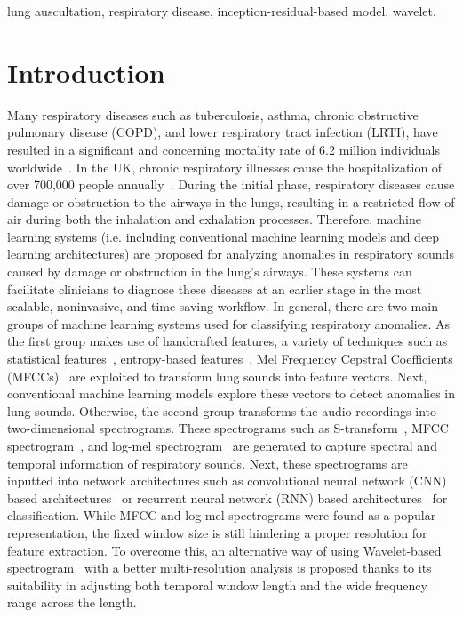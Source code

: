 \documentclass[conference]{IEEEtran}
\begin{document}
\begin{IEEEkeywords}
lung auscultation, respiratory disease, inception-residual-based model, wavelet.
\end{IEEEkeywords}

\section{Introduction}
\label{intro}

Many respiratory diseases such as tuberculosis, asthma, chronic obstructive pulmonary disease (COPD), and lower respiratory tract infection (LRTI), have resulted in a significant and concerning mortality rate of 6.2 million individuals worldwide~\cite{who_1}. In the UK, chronic respiratory illnesses cause the hospitalization of over 700,000 people annually~\cite{lunguk}. During the initial phase, respiratory diseases cause damage or obstruction to the airways in the lungs, resulting in a restricted flow of air during both the inhalation and exhalation processes. Therefore, machine learning systems (i.e. including conventional machine learning models and deep learning architectures) are proposed for analyzing anomalies in respiratory sounds caused by damage or obstruction in the lung's airways. These systems can facilitate clinicians to diagnose these diseases at an earlier stage in the most scalable, noninvasive, and time-saving workflow.
In general, there are two main groups of machine learning systems used for classifying respiratory anomalies. As the first group makes use of handcrafted features, a variety of techniques such as statistical features~\cite{palaniappan2013machine}, entropy-based features~\cite{zhang2009novel}, Mel Frequency Cepstral Coefficients (MFCCs)~\cite{jung2021efficiently} are exploited to transform lung sounds into feature vectors. Next, conventional machine learning models explore these vectors to detect anomalies in lung sounds. Otherwise, the second group transforms the audio recordings into two-dimensional spectrograms. These spectrograms such as S-transform~\cite{moukadem2013robust}, MFCC spectrogram~\cite{datta2017automated}, and log-mel spectrogram~\cite{garcia2020detecting, 9909611} are generated to capture spectral and temporal information of respiratory sounds. Next, these spectrograms are inputted into network architectures such as convolutional neural network (CNN) based architectures~\cite{pham2021cnn, ngo2021deep} or recurrent neural network (RNN) based architectures~\cite{ic_cnn_19_iccas, perna2019deep} for classification. While MFCC and log-mel spectrograms were found as a popular representation, the fixed window size is still hindering a proper resolution for feature extraction. To overcome this, an alternative way of using Wavelet-based spectrogram~\cite{akay1997wavelet, 9871440} with a better multi-resolution analysis is proposed thanks to its suitability in adjusting both temporal window length and the wide frequency range across the length.
\end{document}
